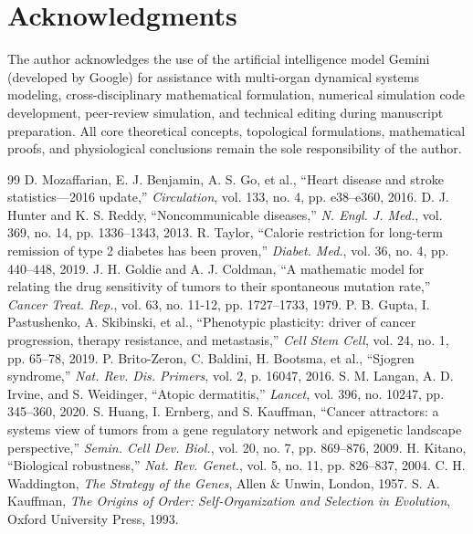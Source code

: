 \documentclass[11pt,a4paper]{article}
\begin{document}
\section*{Acknowledgments}
The author acknowledges the use of the artificial intelligence model Gemini (developed by Google) for assistance with multi-organ dynamical systems modeling, cross-disciplinary mathematical formulation, numerical simulation code development, peer-review simulation, and technical editing during manuscript preparation. All core theoretical concepts, topological formulations, mathematical proofs, and physiological conclusions remain the sole responsibility of the author.

\begin{thebibliography}{99}
 D. Mozaffarian, E. J. Benjamin, A. S. Go, et al., ``Heart disease and stroke statistics---2016 update,'' \textit{Circulation}, vol. 133, no. 4, pp. e38--e360, 2016.
 D. J. Hunter and K. S. Reddy, ``Noncommunicable diseases,'' \textit{N. Engl. J. Med.}, vol. 369, no. 14, pp. 1336--1343, 2013.
 R. Taylor, ``Calorie restriction for long-term remission of type 2 diabetes has been proven,'' \textit{Diabet. Med.}, vol. 36, no. 4, pp. 440--448, 2019.
 J. H. Goldie and A. J. Coldman, ``A mathematic model for relating the drug sensitivity of tumors to their spontaneous mutation rate,'' \textit{Cancer Treat. Rep.}, vol. 63, no. 11-12, pp. 1727--1733, 1979.
 P. B. Gupta, I. Pastushenko, A. Skibinski, et al., ``Phenotypic plasticity: driver of cancer progression, therapy resistance, and metastasis,'' \textit{Cell Stem Cell}, vol. 24, no. 1, pp. 65--78, 2019.
 P. Brito-Zeron, C. Baldini, H. Bootsma, et al., ``Sjogren syndrome,'' \textit{Nat. Rev. Dis. Primers}, vol. 2, p. 16047, 2016.
 S. M. Langan, A. D. Irvine, and S. Weidinger, ``Atopic dermatitis,'' \textit{Lancet}, vol. 396, no. 10247, pp. 345--360, 2020.
 S. Huang, I. Ernberg, and S. Kauffman, ``Cancer attractors: a systems view of tumors from a gene regulatory network and epigenetic landscape perspective,'' \textit{Semin. Cell Dev. Biol.}, vol. 20, no. 7, pp. 869--876, 2009.
 H. Kitano, ``Biological robustness,'' \textit{Nat. Rev. Genet.}, vol. 5, no. 11, pp. 826--837, 2004.
 C. H. Waddington, \textit{The Strategy of the Genes}, Allen \& Unwin, London, 1957.
 S. A. Kauffman, \textit{The Origins of Order: Self-Organization and Selection in Evolution}, Oxford University Press, 1993.

\end{thebibliography}
\end{document}

